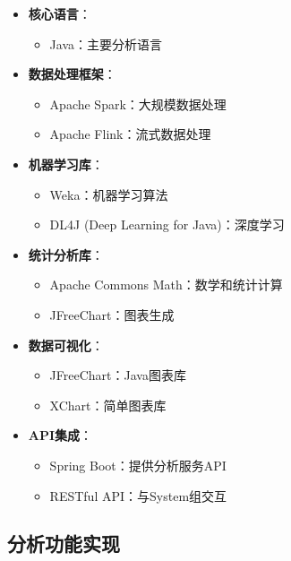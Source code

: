 \documentclass[a4paper,12pt]{article}
\begin{document}
\begin{itemize}
  \item \textbf{核心语言}：
    \begin{itemize}
      \item Java：主要分析语言
    \end{itemize}
  
  \item \textbf{数据处理框架}：
    \begin{itemize}
      \item Apache Spark：大规模数据处理
      \item Apache Flink：流式数据处理
    \end{itemize}
  
  \item \textbf{机器学习库}：
    \begin{itemize}
      \item Weka：机器学习算法
      \item DL4J (Deep Learning for Java)：深度学习
    \end{itemize}
  
  \item \textbf{统计分析库}：
    \begin{itemize}
      \item Apache Commons Math：数学和统计计算
      \item JFreeChart：图表生成
    \end{itemize}
  
  \item \textbf{数据可视化}：
    \begin{itemize}
      \item JFreeChart：Java图表库
      \item XChart：简单图表库
    \end{itemize}
  
  \item \textbf{API集成}：
    \begin{itemize}
      \item Spring Boot：提供分析服务API
      \item RESTful API：与System组交互
    \end{itemize}
\end{itemize}

\subsection{分析功能实现}
\end{document}

